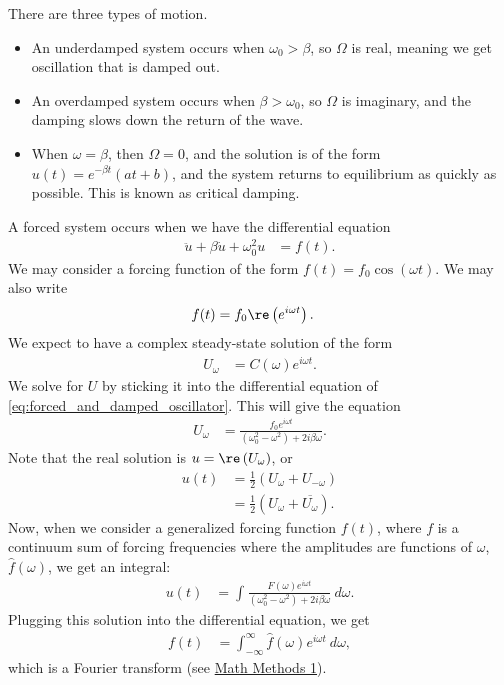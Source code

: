 \documentclass[10pt]{mypackage}
\begin{document}
  There are three types of motion.
  \begin{itemize}
    \item An underdamped system occurs when $\omega_0 > \beta$, so $\Omega$ is real, meaning we get oscillation that is damped out.
    \item An overdamped system occurs when $\beta > \omega_0$, so $\Omega$ is imaginary, and the damping slows down the return of the wave.
    \item When $\omega = \beta$, then $\Omega = 0$, and the solution is of the form $u\left( t \right) = e^{-\beta t}\left( at + b \right)$, and the system returns to equilibrium as quickly as possible. This is known as critical damping.
  \end{itemize}
  A forced system occurs when we have the differential equation
  \begin{align*}
    \ddot{u} + \beta \dot{u} + \omega_0^2u &= f(t).\label{eq:forced_and_damped_oscillator}\tag{\textdagger}
  \end{align*}
  We may consider a forcing function of the form $f(t) = f_0\cos\left( \omega t \right)$. We may also write
  \begin{align*}
    f(t) &= f_0\re\left( e^{i\omega t} \right).
  \end{align*}
  We expect to have a complex steady-state solution of the form
  \begin{align*}
    U_{\omega} &= C(\omega)e^{i\omega t}.
  \end{align*}
  We solve for $U$ by sticking it into the differential equation of \ref{eq:forced_and_damped_oscillator}. This will give the equation
  \begin{align*}
    U_{\omega} &= \frac{f_0e^{i\omega t}}{\left( \omega_0^2 - \omega^2 \right) + 2i\beta\omega}.
  \end{align*}
  Note that the real solution is $u = \re\left( U_{\omega} \right)$, or
  \begin{align*}
    u(t) &= \frac{1}{2}\left( U_{\omega} + U_{-\omega} \right)\\
         &= \frac{1}{2}\left( U_{\omega} + \overline{U_{\omega}} \right).
  \end{align*}
  Now, when we consider a generalized forcing function $f(t)$, where $f$ is a continuum sum of forcing frequencies where the amplitudes are functions of $\omega$, $\hat{f}\left( \omega \right)$, we get an integral:
  \begin{align*}
    u(t) &= \int_{}^{} \frac{F(\omega)e^{i\omega t}}{\left( \omega_0^2-\omega^2 \right) + 2i\beta\omega}\:d\omega.
  \end{align*}
  Plugging this solution into the differential equation, we get
  \begin{align*}
  f(t) &= \int_{-\infty}^{\infty} \hat{f}\left( \omega \right)e^{i\omega t}\:d\omega,
  \end{align*}
  which is a Fourier transform (see \href{https://ai.avinash-iyer.com/Classes_and_Homework/College/Y4/Y4S1,\%20Math\%20Methods/math_methods_notes.pdf}{Math Methods 1}).
\end{document}
